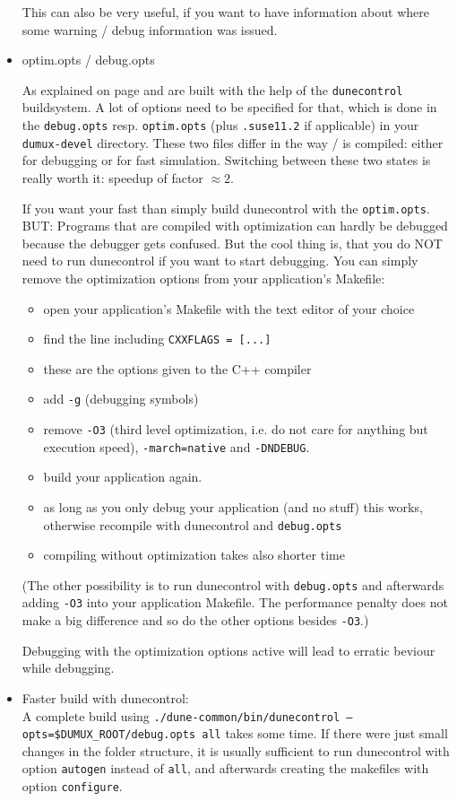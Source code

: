 \begin{itemize}
This can also be very useful, if you want to have information about where some warning / debug information was issued. 

\item optim.opts / debug.opts

As explained on page \pageref{buildIt} \Dune and \Dumux are built with the help of the \verb+dunecontrol+ buildsystem. 
A lot of options need to be specified for that, which is done in the \verb+debug.opts+ resp. \verb+optim.opts+ 
(plus \verb+.suse11.2+ if applicable) in your \verb+dumux-devel+ directory. These two files differ in the way \Dune / \Dumux is compiled: either for debugging or for fast simulation. Switching between these two states is really 
worth it: speedup of factor $\approx 2$. 

If you want your \Dumux fast than simply build dunecontrol with the \verb+optim.opts+. BUT: Programs that are compiled with optimization can hardly 
be debugged because the debugger gets confused. But the cool thing is, that you do NOT need to run dunecontrol if you want to start debugging. You can simply remove the optimization options from your application's Makefile:
\begin{itemize}
\item open your application's Makefile with the text editor of your choice
\item find the line including \verb+CXXFLAGS = [...]+
\item these are the options given to the C++ compiler
\item add \verb+-g+ (debugging symbols)
\item remove  \verb+-O3+ (third level optimization, i.e. do not care for anything but execution speed),  \verb+-march=native+ and \verb+-DNDEBUG+.
\item build your application again. 
\item as long as you only debug your application (and no \Dune stuff) this works, otherwise recompile with dunecontrol and \verb+debug.opts+
\item compiling without optimization takes also shorter time
\end{itemize}

(The other possibility is to run dunecontrol with \verb+debug.opts+ and afterwards adding \verb+-O3+ into your application Makefile. The performance  penalty does not make a big difference and so do the other options besides \verb+-O3+.)

Debugging with the optimization options active will lead to erratic beviour while debugging. 

\item Faster build with dunecontrol:\\
A complete build using \texttt{./dune-common/bin/dunecontrol --opts=\$DUMUX\_ROOT/debug.opts all} takes some time. If there were just small changes in the folder structure, it is usually sufficient to run dunecontrol with option \texttt{autogen} instead of \texttt{all}, and afterwards creating the makefiles with option \texttt{configure}.

\end{itemize}

